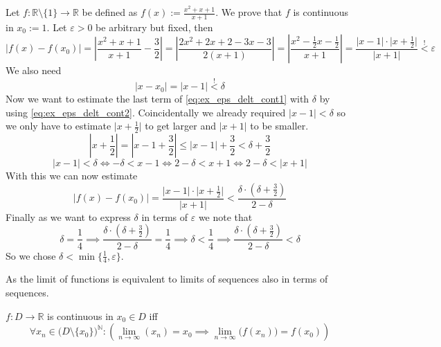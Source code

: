 \begin{example}
   Let \(f: \mathbb{R}\setminus\{1\} \to \mathbb{R}\) be defined as \(f(x) := \frac{x^2+x+1}{x+1}\).
   We prove that \(f\) is continuous in \(x_0 := 1\).
   Let \(\varepsilon > 0\) be arbitrary but fixed, then
   \begin{equation}\label{eq:ex_eps_delt_cont1}
      \lvert f(x) - f(x_0)\rvert = \left\lvert\frac{x^2+x+1}{x+1} - \frac{3}{2}\right\rvert = \left\lvert \frac{2x^2+2x+2-3x-3}{2(x+1)}\right\rvert = \left\lvert\frac{x^2-\frac{1}{2}x - \frac{1}{2}}{x+1}\right\rvert = \frac{\lvert x-1\rvert \cdot \lvert x+\frac{1}{2}\rvert}{\lvert x+1\rvert} \overset{!}{<} \varepsilon
   \end{equation}
   We also need
   \begin{equation}\label{eq:ex_eps_delt_cont2}
      \lvert x - x_0 \rvert = \lvert x - 1\rvert \overset{!}{<} \delta
   \end{equation}
   Now we want to estimate the last term of \cref{eq:ex_eps_delt_cont1} with \(\delta\) by using \cref{eq:ex_eps_delt_cont2}.
   Coincidentally we already required \(\lvert x - 1\rvert < \delta\) so we only have to estimate \(\lvert x + \frac{1}{2}\rvert\) to get larger and \(\lvert x + 1\rvert\) to be smaller.
   \[\left\lvert x + \frac{1}{2}\right\rvert = \left\lvert x - 1 + \frac{3}{2}\right\rvert \leq \lvert x - 1 \rvert + \frac{3}{2} < \delta + \frac{3}{2}\]
   \[\lvert x - 1\lvert < \delta \iff -\delta < x - 1 \iff 2-\delta < x+1 \iff 2-\delta < \lvert x+1\rvert\]
   With this we can now estimate
   \[\lvert f(x) - f(x_0)\rvert = \frac{\lvert x-1\rvert \cdot \lvert x+\frac{1}{2}\rvert}{\lvert x+1\rvert} < \frac{\delta \cdot (\delta + \frac{3}{2})}{2-\delta}\]
   Finally as we want to express \(\delta\) in terms of \(\varepsilon\) we note that
   \[\delta = \frac{1}{4} \implies \frac{\delta \cdot (\delta + \frac{3}{2})}{2-\delta} = \frac{1}{4} \implies \delta < \frac{1}{4} \implies \frac{\delta \cdot (\delta + \frac{3}{2})}{2-\delta} < \delta\]
   So we chose \(\delta < \min\{\frac{1}{4}, \varepsilon\}\).
\end{example}
As the limit of functions is equivalent to limits of sequences also in terms of sequences.
\begin{definition}\label{def:seq_cont}
   \(f: D \to \mathbb{R}\) is continuous in \(x_0 \in D\) iff
   \[\forall x_n \in \big(D\setminus\{x_0\}\big)^\mathbb{N}: \left(\lim_{n \to \infty}(x_n) = x_0 \implies \lim_{n \to \infty}\big(f(x_n)\big) = f(x_0)\right)\]
\end{definition}
